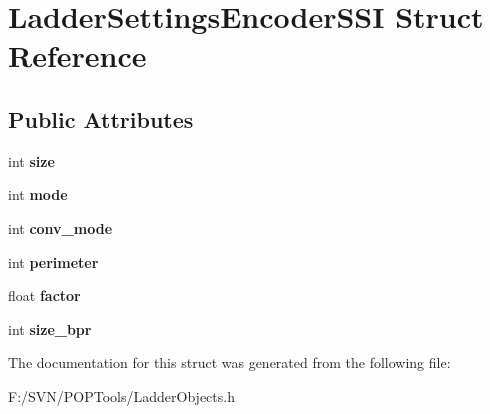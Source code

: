 \hypertarget{struct_ladder_settings_encoder_s_s_i}{\section{Ladder\-Settings\-Encoder\-S\-S\-I Struct Reference}
\label{struct_ladder_settings_encoder_s_s_i}
}
\subsection*{Public Attributes}
\begin{DoxyCompactItemize}
\item 
\hypertarget{struct_ladder_settings_encoder_s_s_i_a38b77a6774c2165765a1102c1e724cef}{int {\bfseries size}}\label{struct_ladder_settings_encoder_s_s_i_a38b77a6774c2165765a1102c1e724cef}

\item 
\hypertarget{struct_ladder_settings_encoder_s_s_i_a9e2249c68eead84509d4bdb620f9ac71}{int {\bfseries mode}}\label{struct_ladder_settings_encoder_s_s_i_a9e2249c68eead84509d4bdb620f9ac71}

\item 
\hypertarget{struct_ladder_settings_encoder_s_s_i_a0de12a2ed3159c175d26bf13e715cb9e}{int {\bfseries conv\-\_\-mode}}\label{struct_ladder_settings_encoder_s_s_i_a0de12a2ed3159c175d26bf13e715cb9e}

\item 
\hypertarget{struct_ladder_settings_encoder_s_s_i_a196298487876a71df442da5ad7754567}{int {\bfseries perimeter}}\label{struct_ladder_settings_encoder_s_s_i_a196298487876a71df442da5ad7754567}

\item 
\hypertarget{struct_ladder_settings_encoder_s_s_i_af6f87e1eb7073e83812c57b9735b7274}{float {\bfseries factor}}\label{struct_ladder_settings_encoder_s_s_i_af6f87e1eb7073e83812c57b9735b7274}

\item 
\hypertarget{struct_ladder_settings_encoder_s_s_i_a4285700e6fc32a7047abb5176d2ab711}{int {\bfseries size\-\_\-bpr}}\label{struct_ladder_settings_encoder_s_s_i_a4285700e6fc32a7047abb5176d2ab711}

\end{DoxyCompactItemize}


The documentation for this struct was generated from the following file\-:\begin{DoxyCompactItemize}
\item 
F\-:/\-S\-V\-N/\-P\-O\-P\-Tools/Ladder\-Objects.\-h\end{DoxyCompactItemize}
